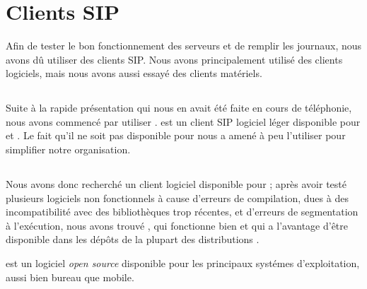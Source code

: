\section{Clients SIP}

Afin de tester le bon fonctionnement des serveurs et de remplir les journaux, nous avons dû utiliser des clients SIP. Nous avons principalement utilisé des clients logiciels, mais nous avons aussi essayé des clients matériels.

\subsection{\xlite}

Suite à la rapide présentation qui nous en avait été faite en cours de téléphonie, nous avons commencé par utiliser {\xlite}. {\xlite} est un client SIP logiciel léger disponible pour {\win} et {\mac}. Le fait qu’il ne soit pas disponible pour {\lnx} nous a amené à peu l’utiliser pour simplifier notre organisation.


\subsection{\lnp}

Nous avons donc recherché un client logiciel disponible pour {\lnx} ; après avoir testé plusieurs logiciels non fonctionnels à cause d’erreurs de compilation, dues à des incompatibilité avec des bibliothèques trop récentes, et d’erreurs de segmentation à l’exécution, nous avons trouvé {\lnp}, qui fonctionne bien et qui a l’avantage d’être disponible dans les dépôts de la plupart des distributions {\lnx}.


{\lnp} est un logiciel \textit{open source} disponible pour les principaux systémes d’exploitation, aussi bien bureau que mobile.


\subsection{\cph}


\subsection{\ata}

